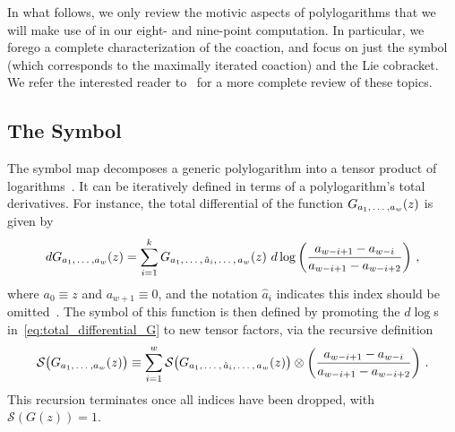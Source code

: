 \documentclass[11pt]{article}
\newcommand{\fwboxL}[2]{\text{\makebox[#1][l]{$#2$}}}
\begin{document}
In what follows, we only review the motivic aspects of polylogarithms that we will make use of in our eight- and nine-point computation. In particular, we forego a complete characterization of the coaction, and focus on just the symbol (which corresponds to the maximally iterated coaction) and the Lie cobracket. We refer the interested reader to~\cite{Duhr:2014woa} for a more complete review of these topics.






\subsection{The Symbol}

The symbol map decomposes a generic polylogarithm into a tensor product of logarithms~\cite{Goncharov:2010jf}. It can be iteratively defined in terms of a polylogarithm's total derivatives. For instance, the total differential of the function $G_{a_1, \fwboxL{13pt}{\,\dots}, a_w}(z)$ is given by
\begin{equation} \label{eq:total_differential_G}
d G_{a_1, \fwboxL{13pt}{\,\dots}, a_w}(z) = \sum_{i=1}^{k} G_{a_1,\fwboxL{13pt}{\,\dots},\,\hat{a}_i,\fwboxL{13pt}{\,\dots},\,a_w}(z) \ d\log \left( \frac{a_{w-i+1} - a_{w-i}}{a_{w-i+1} - a_{w-i+2}} \right)\, ,
\end{equation} 
where $a_0 \equiv z$ and $a_{w+1} \equiv 0$, and the notation $\hat{a}_i$ indicates this index should be omitted~\cite{GoncharovMixedTate,Duhr:2011zq}. The symbol of this function is then defined by promoting the $d\log$s in~\eqref{eq:total_differential_G} to new tensor factors, via the recursive definition  
\begin{equation} \label{eq:symbol_def}
\mathcal{S}\big(G_{a_1, \fwboxL{13pt}{\,\dots}, a_w}(z)\big) \equiv \sum_{i=1}^{w} \mathcal{S}\big(G_{a_1,\fwboxL{13pt}{\,\dots},\,\hat{a}_i,\fwboxL{13pt}{\,\dots},\,a_w}(z) \big) \otimes \left( \frac{a_{w-i+1} - a_{w-i}}{a_{w-i+1} - a_{w-i+2}} \right)\, .
\end{equation} 
This recursion terminates once all indices have been dropped, with $\mathcal{S}(G(z)) = 1$.
\end{document}
